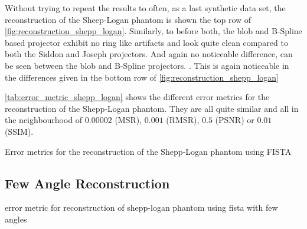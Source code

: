 Without trying to repeat the results to often, as a last synthetic data set, the reconstruction of
the Sheep-Logan phantom is shown the top row of \autoref{fig:reconstruction_shepp_logan}. Similarly,
to before both, the blob and B-Spline based projector exhibit no ring like artifacts and look quite
clean compared to both the Siddon and Joseph projectors. And again no noticeable difference, can be
seen between the blob and B-Spline projectors. . This is again noticeable in the differences given in the bottom row of
\autoref{fig:reconstruction_shepp_logan}

\autoref{tab:error_metric_shepp_logan} shows the different error metrics for the reconstruction of
the Shepp-Logan phantom. They are all quite similar and all in the neighbourhood of \(0.00002\)
(MSR), \(0.001\) (RMSR), \(0.5\) (PSNR) or \(0.01\) (SSIM). 

\begin{table}%
	\centering
	\caption{Error metrics for the reconstruction of the Shepp-Logan phantom using FISTA}%
	\label{tab:error_metric_shepp_logan}
\end{table}

\subsection{Few Angle Reconstruction}\label{sec:experiments_few_angle}

\begin{table}%
	\centering
	\caption{error metric for reconstruction of shepp-logan phantom using fista with few angles}%
	\label{tab:error_metric_shepp_logan_few_angles}
\end{table}


